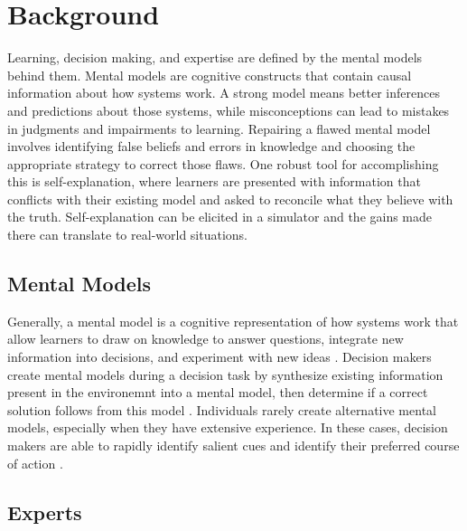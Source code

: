 
\chapter{Background}

Learning, decision making, and expertise are defined by the mental models behind them. Mental models are cognitive constructs that contain causal information about how systems work. A strong model means better inferences and predictions about those systems, while misconceptions can lead to mistakes in judgments and impairments to learning. Repairing a flawed mental model involves identifying false beliefs and errors in knowledge and choosing the appropriate strategy to correct those flaws. One robust tool for accomplishing this is self-explanation, where learners are presented with information that conflicts with their existing model and asked to reconcile what they believe with the truth. Self-explanation can be elicited in a simulator and the gains made there can translate to real-world situations.

\section{Mental Models}

Generally, a mental model is a cognitive representation of how systems work \citep{Klein2006} that allow learners to draw on knowledge to answer questions, integrate new information into decisions, and experiment with new ideas \citep{Vosniadou2002}. Decision makers create mental models during a decision task by synthesize existing information present in the environemnt into a mental model, then determine if a correct solution follows from this model \citep{Newstead2002}. Individuals rarely create alternative mental models, especially when they have extensive experience. In these cases, decision makers are able to rapidly identify salient cues and identify their preferred course of action \citep{Klein1993}.

\section{Experts}
\label{experts}

